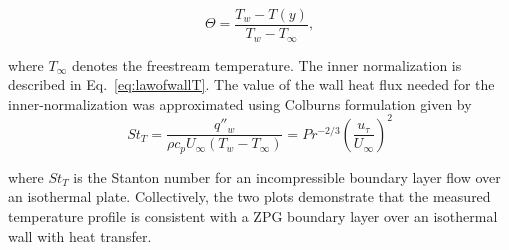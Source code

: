 \begin{equation}
\Theta = \frac{T_w - T(y)}{T_w - T_\infty},
\end{equation}

\noindent where $T_\infty$ denotes the freestream temperature. The inner normalization is described in Eq.~\ref{eq:lawofwallT}. The value of the wall heat flux needed for the inner-normalization was approximated using Colburns formulation given by 
\begin{equation}
St_T = \frac{q''_w}{\rho c_p U_\infty (T_{w} - T_\infty)} = Pr^{-2/3} \left(\frac{u_\tau}{U_\infty}\right)^2 
\label{eq:qw}
\end{equation}

\noindent where $St_T$ is the Stanton number for an incompressible boundary layer flow over an isothermal plate. Collectively, the two plots demonstrate that the measured temperature profile is consistent with a ZPG boundary layer over an isothermal wall with heat transfer.  

%


